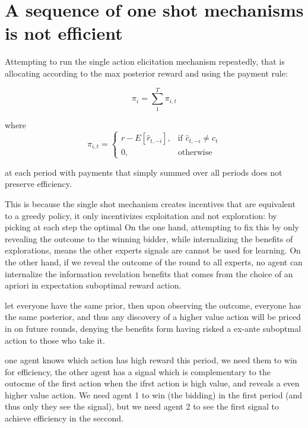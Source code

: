 \section{A sequence of one shot mechanisms is not efficient}

Attempting to run the single action elicitation mechanism repeatedly, that is allocating according to the max posterior reward and using the payment rule:

\[
    \pi_i = \sum_1^T \pi_{i,t} 
\]

where 
\[
    \pi_{i,t} =
\begin{cases}
    r - E[\hat{r}_{t,-i}] ,& \text{if } \hat{c}_{t,-i} \neq c_t\\
    0,              & \text{otherwise}
\end{cases}
\]

 at each period with payments that simply summed over all periods does not preserve efficiency.

This is because the single shot mechanism creates incentives that are equivalent to a greedy policy, it only incentivizes exploitation and not exploration: by picking at each step the optimal 
On the one hand, attempting to fix this by only revealing the outcome to the winning bidder, while internalizing the benefits of explorations, means the other experts signals are cannot be used for learning.
On the other hand, if we reveal the outcome of the round to all experts,  no agent can internalize the information revelation benefits that comes from the choice of an apriori in expectation suboptimal reward action. 

\begin{eg}
let everyone have the same prior, then upon observing the outcome, everyone has the same posterior, and thus any discovery of a higher value action will be priced in on future rounds, denying the benefits form having risked a ex-ante suboptmal action to those who take it. 
\end{eg}

\begin{eg}
one agent knows which action has high reward this period, we need them to win for efficiency, the other agent has a signal which is complementary to the outocme of the first action when the ifrst action is high value, and reveals a even higher value action. We need agent 1 to win (the bidding) in the first period (and thus only they see the signal), but we need agent 2 to see the first signal to achieve efficiency in the seccond.
\end{eg}


